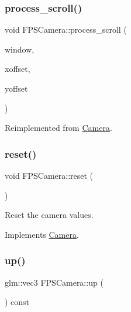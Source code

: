 \subsubsection{\texorpdfstring{process\+\_\+scroll()}{process\_scroll()}}
{\footnotesize\ttfamily void F\+P\+S\+Camera\+::process\+\_\+scroll (\begin{DoxyParamCaption}\item[{G\+L\+F\+Wwindow $\ast$}]{window,  }\item[{double}]{xoffset,  }\item[{double}]{yoffset }\end{DoxyParamCaption})\hspace{0.3cm}{\ttfamily [virtual]}}



Reimplemented from \hyperlink{classCamera_ac13cc5fa7a3a5c40e53d95e987c1ff04}{Camera}.

\mbox{\label{classFPSCamera_a5076d0c700255c33daff490d73c77761}} 
\subsubsection{\texorpdfstring{reset()}{reset()}}
{\footnotesize\ttfamily void F\+P\+S\+Camera\+::reset (\begin{DoxyParamCaption}{ }\end{DoxyParamCaption})\hspace{0.3cm}{\ttfamily [virtual]}}



Reset the camera values. 



Implements \hyperlink{classCamera_aa7695a960438e5571e14f50ed69f6623}{Camera}.

\mbox{\label{classFPSCamera_a1b6470a9ebb906bc31a2742b943552a1}} 
\subsubsection{\texorpdfstring{up()}{up()}}
{\footnotesize\ttfamily glm\+::vec3 F\+P\+S\+Camera\+::up (\begin{DoxyParamCaption}{ }\end{DoxyParamCaption}) const\hspace{0.3cm}{\ttfamily [virtual]}}



